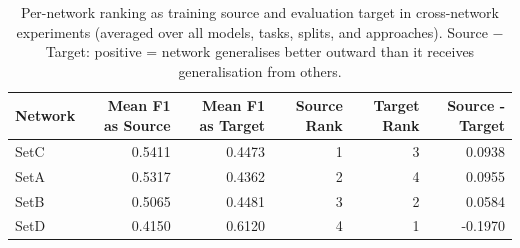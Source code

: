 \begin{table}
\caption{Per-network ranking as training source and evaluation target in cross-network experiments (averaged over all models, tasks, splits, and approaches). Source $-$ Target: positive = network generalises better outward than it receives generalisation from others.}
\label{tab:q4_source_ranking}
\begin{tabular}{lrrrrr}
\toprule
Network & Mean F1 as Source & Mean F1 as Target & Source Rank & Target Rank & Source - Target \\
\midrule
SetC & 0.5411 & 0.4473 & 1 & 3 & 0.0938 \\
SetA & 0.5317 & 0.4362 & 2 & 4 & 0.0955 \\
SetB & 0.5065 & 0.4481 & 3 & 2 & 0.0584 \\
SetD & 0.4150 & 0.6120 & 4 & 1 & -0.1970 \\
\bottomrule
\end{tabular}
\end{table}
